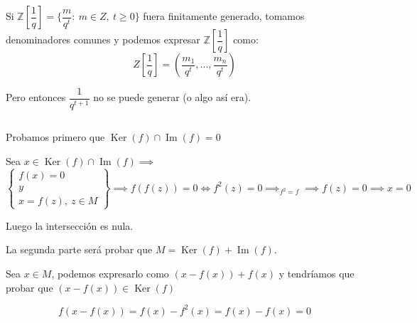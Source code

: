 \documentclass[openany]{book}
\begin{document}
\setcounter{ex}{11}

\begin{exercise}
    $ $

    Si $ \mathbb{Z}[\dfrac{1}{q}] = \{\dfrac{m}{q^{t}}:\ m \in Z,\ t\geq 0\}$ fuera finitamente generado, tomamos denominadores comunes y podemos expresar $ \mathbb{Z}[\dfrac{1}{q}]$ como:
    $$ Z[\dfrac{1}{q}] = \left( \dfrac{m_1}{q^{t}},..., \dfrac{m_n}{q^{t}} \right) $$ 

    Pero entonces $ \dfrac{1}{q^{t+1}}$ no se puede generar (o algo así era).
\end{exercise}

\setcounter{ex}{13}

\begin{exercise}
    $ $
    
    Probamos primero que $ \operatorname{Ker}(f) \cap \operatorname{Im}(f) = 0$
    
    Sea $ x \in \operatorname{Ker}(f) \cap \operatorname{Im}(f) \implies$
    $$ \left\{
    \begin{array}{l}
        f(x) = 0\\ 
        y \\ 
        x = f(z),\ z \in M
    \end{array}
    \right\} \implies f(f(z)) = 0 \iff f^2(z) = 0 \implies_{f^2 = f} \implies f(z) = 0 \implies x = 0 $$

    Luego la intersección es nula.

    La segunda parte será probar que $ M = \operatorname{Ker}(f) + \operatorname{Im}(f)$.

    Sea $ x \in M$, podemos expresarlo como $ (x-f(x))+f(x)$ y tendríamos que probar que $ (x-f(x)) \in \operatorname{Ker}(f)$

    $$ f(x-f(x)) = f(x)-f^2(x) = f(x)-f(x) = 0 $$

\end{exercise}
\end{document}
